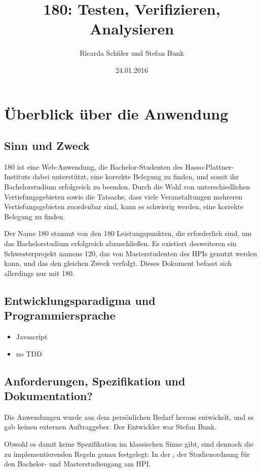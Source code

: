 \documentclass[ngerman]{article}
\title{180: Testen, Verifizieren, Analysieren}
\author{Ricarda Schüler und Stefan Bunk}
\date{24.01.2016}
\begin{document}
\listoftodos
\tableofcontents

\section{Überblick über die Anwendung}
\label{sec:ueberblick}

\subsection{Sinn und Zweck}

180 ist eine Web-Anwendung, die Bachelor-Studenten des Hasso-Plattner-Instituts dabei unterstützt, eine korrekte Belegung zu finden, und somit ihr Bachelorstudium erfolgreich zu beenden.
Durch die Wahl von unterschiedlichen Vertiefungsgebieten sowie die Tatsache, dass viele Veranstaltungen mehreren Vertiefungsgebieten zuordenbar sind, kann es schwierig werden, eine korrekte Belegung zu finden.

Der Name 180 stammt von den 180 Leistungspunkten, die erforderlich sind, um das Bachelorstudium erfolgreich abzuschließen.
Es existiert desweiteren ein Schwesterprojekt namens 120, das von Masterstudenten des HPIs genutzt werden kann, und das den gleichen Zweck verfolgt.
Dieses Dokument befasst sich allerdings nur mit 180.

\subsection{Entwicklungsparadigma und Programmiersprache}

\begin{itemize}
    \item Javascript
    \item no TDD
\end{itemize}

\subsection{Anforderungen, Spezifikation und Dokumentation?}

Die Anwendungen wurde aus dem persönlichen Bedarf heraus entwickelt, und es gab keinen externen Auftraggeber.
Der Entwickler war Stefan Bunk.

Obwohl es damit keine Spezifikation im klassischen Sinne gibt, sind dennoch die zu implementierenden Regeln genau festgelegt:
In der , der Studienordnung für den Bachelor- und Masterstudiengang am HPI.
\end{document}
